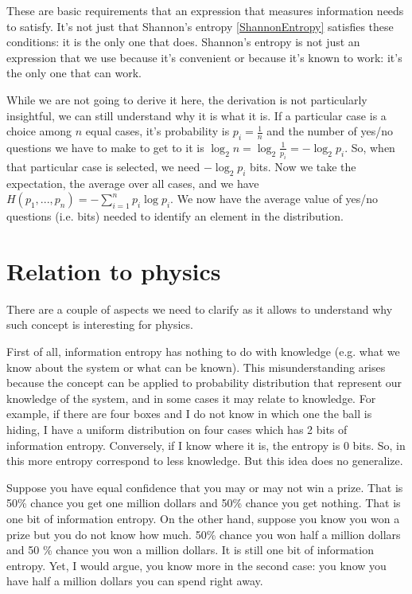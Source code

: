 \documentclass[aps,pra,10pt,floatfix,nofootinbib]{revtex4-1}
\theoremstyle{definition}
\begin{document}
These are basic requirements that an expression that measures information needs to satisfy. It's not just that Shannon's entropy \eqref{ShannonEntropy} satisfies these conditions: it is the only one that does. Shannon's entropy is not just an expression that we use because it's convenient or because it's known to work: it's the only one that can work.

While we are not going to derive it here, the derivation is not particularly insightful, we can still understand why it is what it is. If a particular case is a choice among $n$ equal cases, it's probability is $p_i=\frac{1}{n}$ and the number of yes/no questions we have to make to get to it is $\log_2 n = \log_2 \frac{1}{p_i} = - \log_2 p_i$. So, when that particular case is selected, we need $- \log_2 p_i$ bits. Now we take the expectation, the average over all cases, and we have $H(p_1, ..., p_n) = - \sum_{i=1}^{n} p_i \log p_i$. We now have the average value of yes/no questions (i.e. bits) needed to identify an element in the distribution.

\section{Relation to physics}

There are a couple of aspects we need to clarify as it allows to understand why such concept is interesting for physics.

First of all, information entropy has nothing to do with knowledge (e.g. what we know about the system or what can be known). This misunderstanding arises because the concept can be applied to probability distribution that represent our knowledge of the system, and in some cases it may relate to knowledge. For example, if there are four boxes and I do not know in which one the ball is hiding, I have a uniform distribution on four cases which has 2 bits of information entropy. Conversely, if I know where it is, the entropy is 0 bits. So, in this more entropy correspond to less knowledge. But this idea does no generalize.

Suppose you have equal confidence that you may or may not win a prize. That is 50\% chance you get one million dollars and 50\% chance you get nothing. That is one bit of information entropy. On the other hand, suppose you know you won a prize but you do not know how much. 50\% chance you won half a million dollars and 50 \% chance you won a million dollars. It is still one bit of information entropy. Yet, I would argue, you know more in the second case: you know you have half a million dollars you can spend right away.
\end{document}
